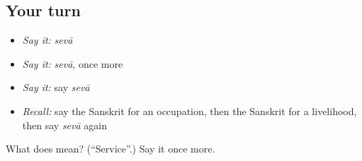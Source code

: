 \subsection*{Your turn}
\begin{itemize}
\raggedright
  \item \emph{Say it:} \emph{sevā}
  \item \emph{Say it:} \emph{sevā}, once more
  \item \emph{Say it:} say \emph{sevā}
  \item \emph{Recall:} say the Sanskrit for an occupation, then the Sanskrit for a livelihood, then say \emph{sevā} again
\end{itemize}

\begin{tcolorbox}[breakable,colback=teal!4,colframe=teal!35!black,title={Before you move on}]
What does  mean? (\textquotedblleft{}Service\textquotedblright{}.) Say it once more.
\end{tcolorbox}

